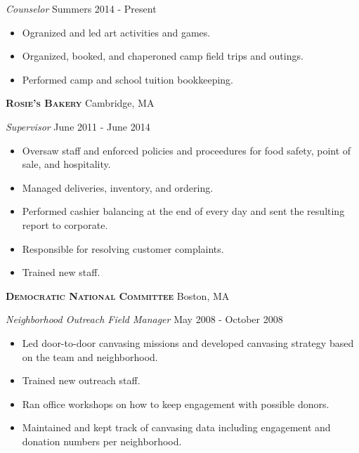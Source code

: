 \documentclass[a4paper]{article}
\begin{document}
\begin{addmargin}[1em]{0em}

\textit{Counselor} \hfill Summers 2014 - Present\\
\vspace{-1mm}
\begin{itemize} \itemsep 1pt
    \item Ogranized and led art activities and games.
    \item Organized, booked, and chaperoned camp field trips and outings.
    \item Performed camp and school tuition bookkeeping.
\end{itemize}
\end{addmargin}

\textbf{\textsc{Rosie’s Bakery}} \hfill Cambridge, MA\\
\vspace{2mm}

\begin{addmargin}[1em]{0em}

\textit{Supervisor} \hfill June 2011 - June 2014\\
\vspace{-1mm}
\begin{itemize} \itemsep 1pt
    \item Oversaw staff and enforced policies and proceedures for food safety, 
        point of sale, and hospitality.
    \item Managed deliveries, inventory, and ordering.
    \item Performed cashier balancing at the end of every day and sent the resulting
        report to corporate.  
    \item Responsible for resolving customer complaints.
    \item Trained new staff.
\end{itemize}

\end{addmargin}

\textbf{\textsc{Democratic National Committee}} \hfill Boston, MA\\
\vspace{2mm}

\begin{addmargin}[1em]{0em}

\textit{Neighborhood Outreach Field Manager} \hfill May 2008 - October 2008\\
\vspace{-1mm}
\begin{itemize} \itemsep 1pt
    \item Led door-to-door canvasing missions and developed canvasing strategy based on
        the team and neighborhood.
    \item Trained new outreach staff.
    \item Ran office workshops on how to keep engagement with possible
        donors.
    \item Maintained and kept track of canvasing data including engagement and donation
        numbers per neighborhood.
\end{itemize}

\end{addmargin}
\end{document}
